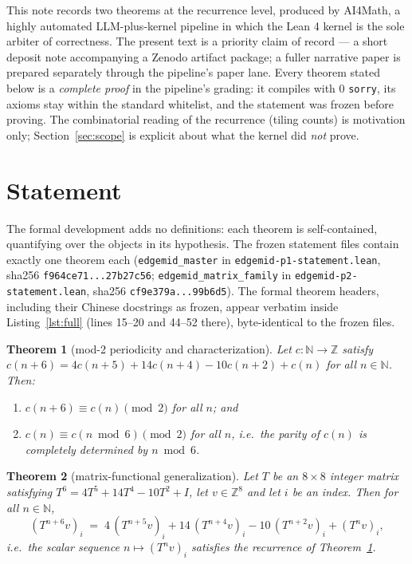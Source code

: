 \documentclass[11pt]{article}
\newtheorem{theorem}{Theorem}
\begin{document}
This note records two theorems at the recurrence level, produced by AI4Math, a
highly automated LLM-plus-kernel pipeline in which the Lean 4 kernel is the
sole arbiter of correctness. The present text is a priority claim of record
--- a short deposit note accompanying a Zenodo artifact package; a fuller
narrative paper is prepared separately through the pipeline's paper lane.
Every theorem stated below is a \emph{complete proof} in the pipeline's
grading: it compiles with 0 \texttt{sorry}, its axioms stay within the
standard whitelist, and the statement was frozen before proving. The
combinatorial reading of the recurrence (tiling counts) is motivation only;
Section~\ref{sec:scope} is explicit about what the kernel did \emph{not}
prove.

\section{Statement}

The formal development adds no definitions: each theorem is self-contained,
quantifying over the objects in its hypothesis. The frozen statement files
contain exactly one theorem each (\texttt{edgemid\_master} in
\texttt{edgemid-p1-statement.lean}, sha256 \texttt{f964ce71...27b27c56};
\texttt{edgemid\_matrix\_family} in \texttt{edgemid-p2-statement.lean}, sha256
\texttt{cf9e379a...99b6d5}). The formal theorem headers, including their
Chinese docstrings as frozen, appear verbatim inside Listing~\ref{lst:full}
(lines 15--20 and 44--52 there), byte-identical to the frozen files.

\begin{theorem}[mod-2 periodicity and characterization]\label{thm:p1}
Let $c:\mathbb{N}\to\mathbb{Z}$ satisfy
$c(n+6)=4c(n+5)+14c(n+4)-10c(n+2)+c(n)$ for all $n\in\mathbb{N}$. Then:
\begin{enumerate}
\item $c(n+6)\equiv c(n)\pmod 2$ for all $n$; and
\item $c(n)\equiv c(n\bmod 6)\pmod 2$ for all $n$, i.e.\ the parity of $c(n)$
is completely determined by $n \bmod 6$.
\end{enumerate}
\end{theorem}

\begin{theorem}[matrix-functional generalization]\label{thm:p2}
Let $T$ be an $8\times 8$ integer matrix satisfying
$T^6=4T^5+14T^4-10T^2+I$, let $v\in\mathbb{Z}^8$ and let $i$ be an index.
Then for all $n\in\mathbb{N}$,
\[
(T^{n+6}v)_i \;=\; 4\,(T^{n+5}v)_i + 14\,(T^{n+4}v)_i - 10\,(T^{n+2}v)_i + (T^n v)_i,
\]
i.e.\ the scalar sequence $n\mapsto (T^n v)_i$ satisfies the recurrence of
Theorem~\ref{thm:p1}.
\end{theorem}
\end{document}
